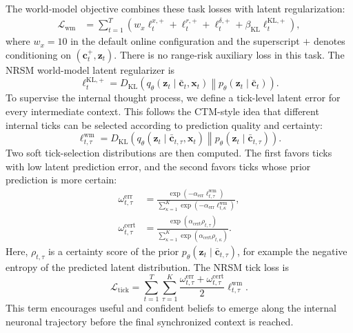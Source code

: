 \documentclass{article}
\begin{document}
The world-model objective combines these task losses with latent regularization:
\begin{align}
\mathcal L_{\mathrm{wm}}
&=\sum_{t=1}^{T}\left(
w_x\ell^{x,+}_{t}+\ell^{r,+}_{t}+\ell^{\delta,+}_{t}
+\beta_{\mathrm{KL}}\ell^{\mathrm{KL},+}_{t}\right),
\label{eq:nrsm_wm_loss}
\end{align}
where $w_x=10$ in the default online configuration and the superscript $+$ denotes conditioning on $(\mathbf c_t^+,\mathbf z_t)$. There is no range-risk auxiliary loss in this task. The NRSM world-model latent regularizer is
\begin{equation}
\ell^{\mathrm{KL},+}_{t}
=
D_{\mathrm{KL}}\!\left(
q_{\theta}(\mathbf z_t\mid\bar{\mathbf c}_t,\mathbf x_t)
\middle\|
p_{\theta}(\mathbf z_t\mid\bar{\mathbf c}_t)
\right).
\label{eq:nrsm_wm_kl_loss}
\end{equation}
To supervise the internal thought process, we define a tick-level latent error for every intermediate context. This follows the CTM-style idea that different internal ticks can be selected according to prediction quality and certainty:
\begin{equation}
\ell^{\mathrm{wm}}_{t,\tau}
=
D_{\mathrm{KL}}\!\left(
q_{\theta}(\mathbf z_t\mid\bar{\mathbf c}_{t,\tau},\mathbf x_t)
\middle\|
p_{\theta}(\mathbf z_t\mid\bar{\mathbf c}_{t,\tau})
\right).
\label{eq:tick_world_model_error}
\end{equation}
Two soft tick-selection distributions are then computed. The first favors ticks with low latent prediction error, and the second favors ticks whose prior prediction is more certain:
\begin{align}
\omega^{\mathrm{err}}_{t,\tau}
&=
\frac{\exp(-\alpha_{\mathrm{err}}\ell^{\mathrm{wm}}_{t,\tau})}
{\sum_{\kappa=1}^{K}
\exp(-\alpha_{\mathrm{err}}\ell^{\mathrm{wm}}_{t,\kappa})},
\label{eq:error_tick_weight}\\
\omega^{\mathrm{cert}}_{t,\tau}
&=
\frac{\exp(\alpha_{\mathrm{cert}}\rho_{t,\tau})}
{\sum_{\kappa=1}^{K}
\exp(\alpha_{\mathrm{cert}}\rho_{t,\kappa})}.
\label{eq:certainty_tick_weight}
\end{align}
Here, $\rho_{t,\tau}$ is a certainty score of the prior $p_{\theta}(\mathbf z_t\mid\bar{\mathbf c}_{t,\tau})$, for example the negative entropy of the predicted latent distribution. The NRSM tick loss is
\begin{equation}
\mathcal L_{\mathrm{tick}}
=
\sum_{t=1}^{T}\sum_{\tau=1}^{K}
\frac{
\omega^{\mathrm{err}}_{t,\tau}
+
\omega^{\mathrm{cert}}_{t,\tau}
}{2}
\ell^{\mathrm{wm}}_{t,\tau}.
\label{eq:nrsm_tick_loss}
\end{equation}
This term encourages useful and confident beliefs to emerge along the internal neuronal trajectory before the final synchronized context is reached.
\end{document}

